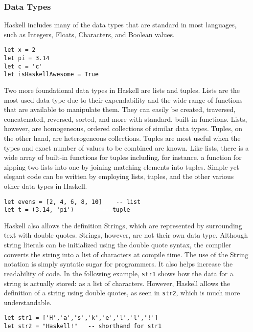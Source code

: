 \documentclass[titlepage,12pt]{article}
\begin{document}
\subsubsection{Data Types}

Haskell includes many of the data types that are standard in most languages, such as Integers, Floats, Characters, and Boolean values. 

\begin{verbatim}
let x = 2
let pi = 3.14
let c = 'c'
let isHaskellAwesome = True
\end{verbatim}

Two more foundational data types in Haskell are lists and tuples. Lists are the most used data type due to their expendability 
and the wide range of functions that are available to manipulate them. They can easily be created, traversed, concatenated, 
reversed, sorted, and more with standard, built-in functions. Lists, however, are homogeneous, ordered collections of
similar data types. Tuples, on the other hand, are heterogeneous collections. Tuples are most useful when the types and exact number of 
values to be combined are known. Like lists, there is a wide array of built-in functions for tuples including, for instance,
a function for zipping two lists into one by joining matching elements into tuples. Simple yet elegant code can be written by
employing lists, tuples, and the other various other data types in Haskell.

\begin{verbatim}
let evens = [2, 4, 6, 8, 10]	-- list
let t = (3.14, 'pi')		-- tuple
\end{verbatim}

Haskell also allows the definition Strings, which are represented by surrounding text with double quotes. Strings, however, 
are not their own data type. Although string literals can be initialized using the double quote syntax, the compiler converts the 
string into a list of characters at compile time. The use of the String notation is simply syntatic sugar for programmers. 
It also helps increase the readability of code. In the following example, \texttt{str1} shows how the data for a string is actually stored: as a list of characters. However, Haskell allows the definition of a string using double quotes, as seen in \texttt{str2}, 
which is much more understandable.

\begin{verbatim}
let str1 = ['H','a','s','k','e','l','l','!']
let str2 = "Haskell!"   -- shorthand for str1
\end{verbatim}
\end{document}
